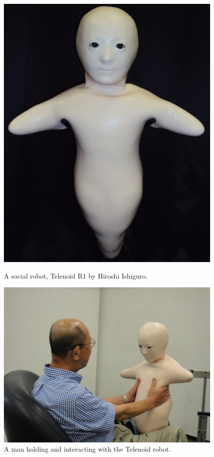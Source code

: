 \begin{figure}[H]
    \begin{minipage}[b]{0.36\linewidth}
        \centering
    \includegraphics[width=\textwidth]{figures/telenoid.jpeg}
    \caption{A social robot, Telenoid R1 by Hiroshi Ishiguro\cite{telenoidIMG}.}
    \label{fig:telenoid}
    \end{minipage}
        \hspace{0.2cm}
    \begin{minipage}[b]{0.60\linewidth}
        \centering
        \includegraphics[width=\textwidth]{figures/telenoid2.jpeg}
        \caption{A man holding and interacting with the Telenoid robot\cite{telenoidIMG}.}
        \label{fig:telenoid2}
    \end{minipage}
\end{figure}

